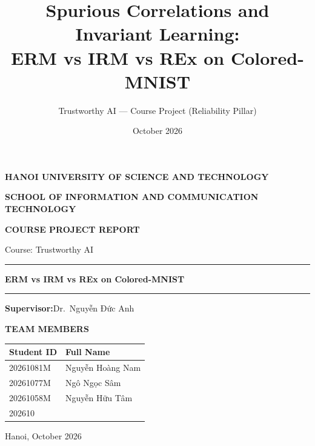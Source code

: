 \documentclass[12pt,a4paper]{article}
\title{Spurious Correlations and Invariant Learning:\\ ERM vs IRM vs REx on Colored-MNIST}
\author{Trustworthy AI --- Course Project (Reliability Pillar)}
\date{October 2026}
\begin{document}
\begin{titlepage}
\setlength{\parskip}{0pt}
\centering
{\fontsize{15}{18}\selectfont\bfseries HANOI UNIVERSITY OF SCIENCE AND TECHNOLOGY\par}
\vspace{4mm}
{\fontsize{12}{15}\selectfont\bfseries SCHOOL OF INFORMATION AND COMMUNICATION TECHNOLOGY\par}
\vspace{12mm}
{\fontsize{15.5}{19}\selectfont\bfseries COURSE PROJECT REPORT\par}
\vspace{4mm}
{\normalsize Course: Trustworthy AI\par}
\vspace{14mm}
\rule{0.86\linewidth}{0.8pt}\par
\vspace{8mm}
{\fontsize{19.5}{25}\selectfont\bfseries {}\par}
\vspace{3mm}
{\large\bfseries ERM vs IRM vs REx on Colored-MNIST\par}
\vspace{8mm}
\rule{0.86\linewidth}{0.5pt}\par
\vspace{12mm}
{\textbf{Supervisor:}\quad Dr.\ Nguyễn Đức Anh\par}
\vspace{10mm}
{\bfseries TEAM MEMBERS\par}
\vspace{3mm}
\renewcommand{\arraystretch}{1.45}
\begin{tabular}{ll}
\toprule
\textbf{Student ID} & \textbf{Full Name} \\
\midrule
20261081M & Nguyễn Hoàng Nam \\
20261077M & Ngô Ngọc Sâm \\
20261058M & Nguyễn Hữu Tâm \\
202610
\bottomrule
\end{tabular}
\vfill
{\normalsize Hanoi, October 2026\par}
\end{titlepage}
\end{document}

